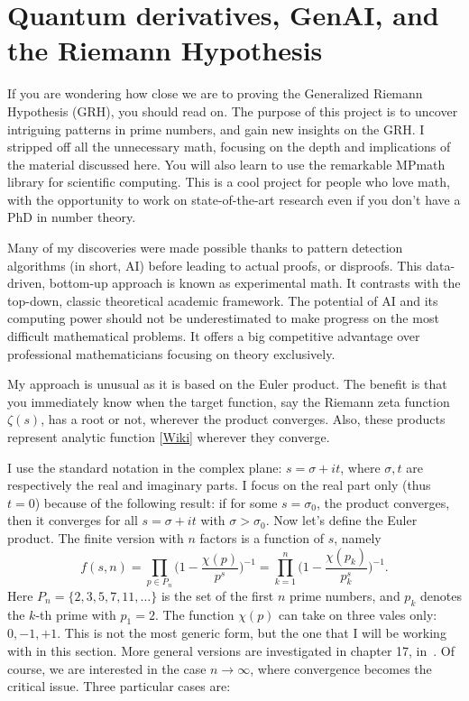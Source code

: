 \documentclass[oneside,10pt]{book}
\begin{document}
\section{Quantum derivatives, GenAI, and the Riemann Hypothesis}

If you are wondering how close we are to proving the 
\textcolor{index}{Generalized Riemann Hypothesis} (GRH), you should read on. The purpose of this project is to uncover 
intriguing patterns
 in prime numbers, and gain new insights on the GRH. I stripped off all the unnecessary math, focusing on 
 the depth and implications of the material discussed here.  You will also learn to use the remarkable 
\textcolor{index}{MPmath} library for scientific computing. This is a cool project for people who love math, 
 with the opportunity to work on state-of-the-art research even if you don't have a PhD in number theory. 

Many of my discoveries
 were made possible thanks to pattern detection algorithms (in short, AI) before leading to actual proofs, or disproofs. This 
 data-driven, bottom-up approach is known as
 \textcolor{index}{experimental math}. It contrasts with the top-down, classic theoretical academic framework.
 The potential of AI and its computing power should not be underestimated to make progress on the most difficult mathematical problems. It offers a big competitive advantage over professional mathematicians focusing on theory exclusively. 

My approach is unusual as it is based on the \textcolor{index}{Euler product}. The benefit is that you immediately know when the target function, 
say the \textcolor{index}{Riemann zeta function} $\zeta(s)$, has a root or not, wherever the product converges. 
 Also, these products represent \textcolor{index}{analytic function} [\href{https://en.wikipedia.org/wiki/Analytic_function}{Wiki}]  
 wherever they converge. 

I use the standard notation in the complex plane:
 $s = \sigma + it$, where $\sigma, t$ are respectively the real and imaginary parts. I focus on the real part only (thus $t=0$) because of the 
 following result: if for some $s=\sigma_0$, the product converges, then it converges for all $s = \sigma + it$ with $\sigma > \sigma_0$.
 Now let's define the Euler product. The finite version with $n$ factors is a function of $s$, namely
$$f(s, n) = \prod_{p\in P_n} \Bigg(1 - \frac{\chi(p)}{p^s}\Bigg)^{-1} = \prod_{k=1}^n \Bigg(1 - \frac{\chi(p_k)}{p_k^s}\Bigg)^{-1}. $$
Here $P_n = \{2, 3, 5, 7, 11,\dots\}$ is the set of the first $n$ prime numbers, and $p_k$ denotes the $k$-th prime with $p_1 = 2$.
The function $\chi(p)$ can take on three vales only: $0, -1, +1$. This is not the most generic form, but the one 
 that I will be working with in this section. More general versions are investigated in chapter 17, in~\cite{vgelsevier}.
Of course, we are interested in the case $n\rightarrow\infty$, where convergence becomes the critical issue. Three particular cases are:
\vspace{1ex}
\end{document}
